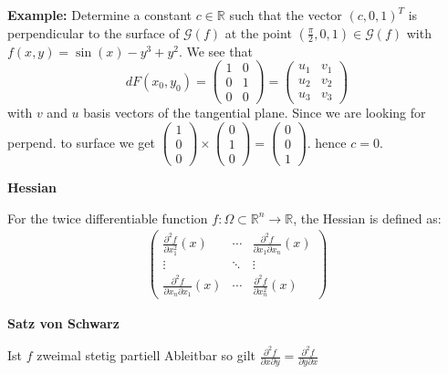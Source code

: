 \documentclass[25pt]{sciposter}
\newcommand{\R}{\mathbb{R}}
\newenvironment{method}[1]{\begin{mdframed}[backgroundcolor=blue!10,innertopmargin=15pt, innerbottommargin=15pt, nobreak=true]
		\textbf{#1 }
	}
	{ 
	\end{mdframed}
}
\begin{document}
\begin{multicols}{3}
\textbf{Example:}
Determine a constant $c\in\R$ such that the vector $(c,0,1)^T$ is perpendicular to the surface of $\mathcal{G}(f)$ at the point $(\frac{\pi}{2},0,1)\in\mathcal{G}(f)$ with $f(x,y) = \sin(x) -y^3 + y^2$. We see that $$dF(x_0,y_0) = \begin{pmatrix}
1 & 0 \\
0 & 1 \\
0 & 0
\end{pmatrix} = \begin{pmatrix}
u_1 & v_1 \\ u_2 & v_2 \\ u_3 & v_3 
\end{pmatrix}$$ with $v$ and $u$ basis vectors of the tangential plane. Since we are looking for perpend. to surface we get $\begin{pmatrix}
	1 \\0 \\ 0 
\end{pmatrix} \times \begin{pmatrix}
0 \\ 1 \\ 0 
\end{pmatrix} = \begin{pmatrix}
0 \\ 0 \\ 1
\end{pmatrix}$. hence $c = 0$.



\begin{method}{Hessian}
	For the twice differentiable function $f: \Omega \subset \R^n \to \R$, the Hessian is defined as:
	\begin{align*}
	\begin{pmatrix}
	\frac{\partial ^2 f}{\partial x_1 ^2}(x) &\cdots &\frac{\partial ^2 f}{\partial x_1  \partial x_n}(x)\\
	\vdots & \ddots & \vdots \\
	\frac{\partial ^2 f}{\partial x_n \partial x_1}(x) &\cdots &\frac{\partial ^2 f}{\partial x_n ^2}(x)
	\end{pmatrix}
	\end{align*}
\end{method}

\begin{method}{Satz von Schwarz}
	Ist $f$ zweimal stetig partiell Ableitbar so gilt $\frac{\partial ^2 f}{\partial x \partial y} = \frac{\partial ^2 f}{\partial y \partial x} $
\end{method}


\end{multicols}
\end{document}
